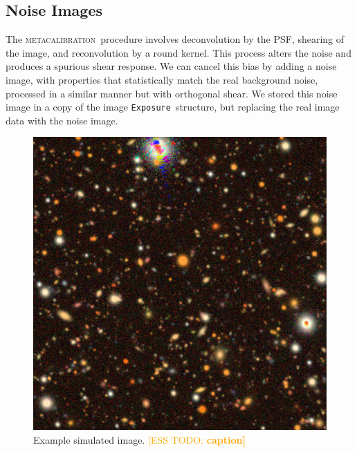 \documentclass[iop, twocolappendix, appendixfloats, numberedappendix, apj]{hackemulateapj}
\newcommand{\esstodo}[1]{\textcolor{orange}{[ESS TODO: \bf #1]}}
\newcommand{\calexp}{\texttt{Exposure}}
\newcommand{\mcal}{\textsc{metacalibration}}
\begin{document}
\subsection{Noise Images} \label{sec:sim:noiseimages}

The \mcal\ procedure involves deconvolution by the PSF, shearing of the image,
and reconvolution by a round kernel.  This process alters the noise and
produces a spurious shear response.  We can cancel this bias by adding a noise
image, with properties that statistically match the real background noise,
processed in a similar manner but with orthogonal shear.  We stored this
noise image in a copy of the image \calexp\ structure, but replacing the
real image data with the noise image.

\begin{figure}
    \includegraphics[width=\columnwidth]{example-image.jpg}
    \caption{
        Example simulated image. \esstodo{caption}
    }
\end{figure}
\end{document}
